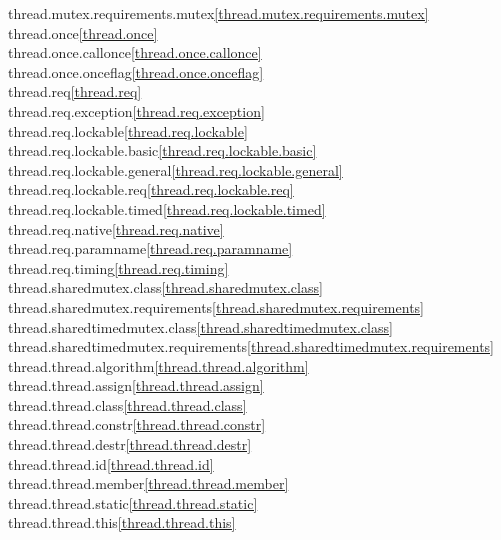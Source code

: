 \begin{multicols}{2}
thread.mutex.requirements.mutex\quad\ref{thread.mutex.requirements.mutex}\\
thread.once\quad\ref{thread.once}\\
thread.once.callonce\quad\ref{thread.once.callonce}\\
thread.once.onceflag\quad\ref{thread.once.onceflag}\\
thread.req\quad\ref{thread.req}\\
thread.req.exception\quad\ref{thread.req.exception}\\
thread.req.lockable\quad\ref{thread.req.lockable}\\
thread.req.lockable.basic\quad\ref{thread.req.lockable.basic}\\
thread.req.lockable.general\quad\ref{thread.req.lockable.general}\\
thread.req.lockable.req\quad\ref{thread.req.lockable.req}\\
thread.req.lockable.timed\quad\ref{thread.req.lockable.timed}\\
thread.req.native\quad\ref{thread.req.native}\\
thread.req.paramname\quad\ref{thread.req.paramname}\\
thread.req.timing\quad\ref{thread.req.timing}\\
thread.sharedmutex.class\quad\ref{thread.sharedmutex.class}\\
thread.sharedmutex.requirements\quad\ref{thread.sharedmutex.requirements}\\
thread.sharedtimedmutex.class\quad\ref{thread.sharedtimedmutex.class}\\
thread.sharedtimedmutex.requirements\quad\ref{thread.sharedtimedmutex.requirements}\\
thread.thread.algorithm\quad\ref{thread.thread.algorithm}\\
thread.thread.assign\quad\ref{thread.thread.assign}\\
thread.thread.class\quad\ref{thread.thread.class}\\
thread.thread.constr\quad\ref{thread.thread.constr}\\
thread.thread.destr\quad\ref{thread.thread.destr}\\
thread.thread.id\quad\ref{thread.thread.id}\\
thread.thread.member\quad\ref{thread.thread.member}\\
thread.thread.static\quad\ref{thread.thread.static}\\
thread.thread.this\quad\ref{thread.thread.this}\\

\end{multicols}

